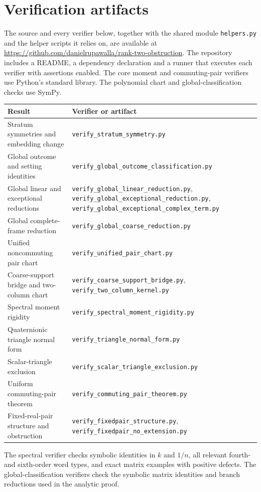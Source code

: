 \documentclass[11pt]{article}
\begin{document}
\section{Verification artifacts}\label{app:verification}
The source and every verifier below, together with the shared module
\texttt{helpers.py} and the helper scripts it relies on, are available at
\url{https://github.com/danielrupawalla/rank-two-obstruction}.
The repository includes a README, a dependency declaration and a runner
that executes each verifier with assertions enabled. The core moment and commuting-pair verifiers use Python's standard
library. The polynomial chart and global-classification checks use SymPy.
\small
\begin{longtable}{p{}p{}}
\toprule Result & Verifier or artifact\\\midrule
Stratum symmetries and embedding change & \texttt{verify\_stratum\_symmetry.py}\\
Global outcome and setting identities & \texttt{verify\_global\_outcome\_classification.py}\\
Global linear and exceptional reductions & \texttt{verify\_global\_linear\_reduction.py}, \texttt{verify\_global\_exceptional\_reduction.py}, \texttt{verify\_global\_exceptional\_complex\_term.py}\\
Global complete-frame reduction & \texttt{verify\_global\_coarse\_reduction.py}\\
Unified noncommuting pair chart & \texttt{verify\_unified\_pair\_chart.py}\\
Coarse-support bridge and two-column chart & \texttt{verify\_coarse\_support\_bridge.py}, \texttt{verify\_two\_column\_kernel.py}\\
Spectral moment rigidity & \texttt{verify\_spectral\_moment\_rigidity.py}\\
Quaternionic triangle normal form & \texttt{verify\_triangle\_normal\_form.py}\\
Scalar-triangle exclusion & \texttt{verify\_scalar\_triangle\_exclusion.py}\\
Uniform commuting-pair theorem & \texttt{verify\_commuting\_pair\_theorem.py}\\
Fixed-real-pair structure and obstruction & \texttt{verify\_fixedpair\_structure.py}, \texttt{verify\_fixedpair\_no\_extension.py}\\
\bottomrule
\end{longtable}
\normalsize
The spectral verifier checks symbolic identities in $k$ and $1/n$, all
relevant fourth- and sixth-order word types, and exact matrix examples
with positive defects. The global-classification verifiers check the
symbolic matrix identities and branch reductions used in the analytic proof.
\end{document}
